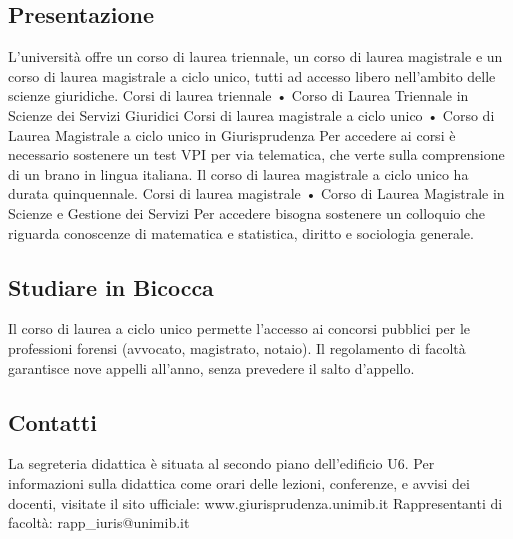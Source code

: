 
\subsection{Presentazione}
L'università offre un corso di laurea triennale, un corso di laurea magistrale e un corso di laurea magistrale a ciclo unico, tutti ad accesso libero nell'ambito delle scienze giuridiche.
Corsi di laurea triennale
     • Corso di Laurea Triennale in Scienze dei Servizi Giuridici 
Corsi di laurea magistrale a ciclo unico
     • Corso di Laurea Magistrale a ciclo unico in Giurisprudenza 
Per accedere ai corsi è necessario sostenere un test VPI per via telematica, che verte sulla comprensione di un brano in lingua italiana. Il corso di laurea magistrale a ciclo unico ha durata quinquennale. 
Corsi di laurea magistrale
     • Corso di Laurea Magistrale in Scienze e Gestione dei Servizi 
Per accedere bisogna sostenere un colloquio che riguarda conoscenze di matematica e statistica, diritto e sociologia generale. 

\subsection{Studiare in Bicocca}
Il corso di laurea a ciclo unico permette l'accesso ai concorsi pubblici per le professioni forensi (avvocato, magistrato, notaio). Il regolamento di facoltà garantisce nove appelli all'anno, senza prevedere il salto d'appello. 

\subsection{Contatti}
La segreteria didattica è situata al secondo piano dell'edificio U6. Per informazioni sulla didattica come orari delle lezioni, conferenze, e avvisi dei docenti, visitate il sito ufficiale: www.giurisprudenza.unimib.it 
Rappresentanti di facoltà: rapp\_iuris@unimib.it 
